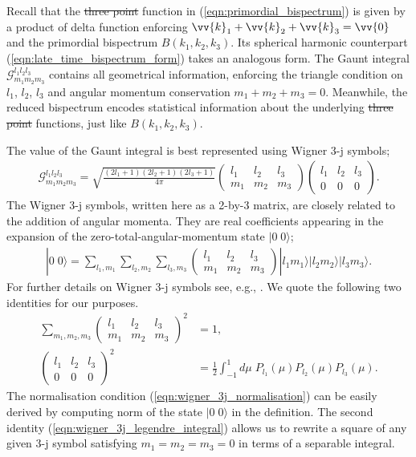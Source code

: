 \documentclass[a4paper,12pt,times,custombib,print,index]{Classes/PhDThesisPSnPDF} %
\providecommand{\DIFadd}[1]{{\protect\color{blue}\uwave{#1}}} %
\providecommand{\DIFdel}[1]{{\protect\color{red}\sout{#1}}}                      %
\providecommand{\DIFaddbegin}{} %
\providecommand{\DIFaddend}{} %
\providecommand{\DIFdelbegin}{} %
\providecommand{\DIFdelend}{} %
\newcommand{\DIFscaledelfig}{0.5}
\newlength{\DIFdelgraphicswidth} %
\newlength{\DIFdelgraphicsheight} %
\newcommand{\DIFaddincludegraphics}[2][]{{\color{blue}\fbox{\DIFOincludegraphics[#1]{#2}}}} %
\newcommand{\DIFdelincludegraphics}[2][]{%
\sbox{\DIFdelgraphicsbox}{\DIFOincludegraphics[#1]{#2}}%
\settoboxwidth{\DIFdelgraphicswidth}{\DIFdelgraphicsbox} %
\settoboxtotalheight{\DIFdelgraphicsheight}{\DIFdelgraphicsbox} %
\scalebox{\DIFscaledelfig}{%
\parbox[b]{\DIFdelgraphicswidth}{\usebox{\DIFdelgraphicsbox}\\[-\baselineskip] \rule{\DIFdelgraphicswidth}{0em}}\llap{\resizebox{\DIFdelgraphicswidth}{\DIFdelgraphicsheight}{%
\setlength{\unitlength}{\DIFdelgraphicswidth}%
\begin{picture}(1,1)%
\thicklines\linethickness{2pt} %
{\color[rgb]{1,0,0}\put(0,0){\framebox(1,1){}}}%
{\color[rgb]{1,0,0}\put(0,0){\line( 1,1){1}}}%
{\color[rgb]{1,0,0}\put(0,1){\line(1,-1){1}}}%
\end{picture}%
}\hspace*{3pt}}} %
} %
\DeclareRobustCommand{\DIFaddbegin}{\DIFOaddbegin \let\includegraphics\DIFaddincludegraphics} %
\DeclareRobustCommand{\DIFaddend}{\DIFOaddend \let\includegraphics\DIFOincludegraphics} %
\DeclareRobustCommand{\DIFdelbegin}{\DIFOdelbegin \let\includegraphics\DIFdelincludegraphics} %
\DeclareRobustCommand{\DIFdelend}{\DIFOaddend \let\includegraphics\DIFOincludegraphics} %
\begin{document}
Recall that the \DIFdelbegin \DIFdel{three point }\DIFdelend \DIFaddbegin \DIFadd{three-point }\DIFaddend function in (\ref{eqn:primordial_bispectrum}) is given by a product of delta function enforcing $\vv{k}_1 + \vv{k}_2 + \vv{k}_3 = \vv{0}$ and the primordial bispectrum $B(k_1,k_2,k_3)$. Its spherical harmonic counterpart (\ref{eqn:late_time_bispectrum_form}) takes an analogous form. The Gaunt integral $\mathcal{G}^{l_1 l_2 l_3}_{m_1 m_2 m_3}$ contains all geometrical information, enforcing the triangle condition on $l_1$, $l_2$, $l_3$ and angular momentum conservation $m_1+m_2+m_3=0$. Meanwhile, the reduced bispectrum encodes statistical information about the underlying \DIFdelbegin \DIFdel{three point }\DIFdelend \DIFaddbegin \DIFadd{three-point }\DIFaddend functions, just like $B(k_1,k_2,k_3)$.

The value of the Gaunt integral is best represented using Wigner 3-j symbols;
\begin{align}
	\mathcal{G}^{l_1 l_2 l_3}_{m_1 m_2 m_3} = \sqrt{\frac{(2l_1+1)(2l_2+1)(2l_3+1)}{4\pi}} \begin{pmatrix}	l_1 & l_2 & l_3 \\ m_1 & m_2 & m_3 \end{pmatrix} \begin{pmatrix}	l_1 & l_2 & l_3 \\ 0 & 0 & 0 \end{pmatrix}.
\end{align}
The Wigner 3-j symbols, written here as a 2-by-3 matrix, are closely related to the addition of angular momenta. They are real coefficients appearing in the expansion of the zero-total-angular-momentum state $|0 \; 0\rangle$;
\begin{align}
	| 0 \; 0 \rangle = \sum_{l_1,m_1} \sum_{l_2,m_2} \sum_{l_3,m_3} \begin{pmatrix}	l_1 & l_2 & l_3 \\ m_1 & m_2 & m_3 \end{pmatrix} | l_1 m_1 \rangle | l_2 m_2 \rangle | l_3 m_3 \rangle.
\end{align}
For further details on Wigner 3-j symbols see, e.g., \cite{Olver2010nist}. We quote the following two identities for our purposes.
\begin{align}
	\sum_{m_1,m_2,m_3} { \begin{pmatrix}	l_1 & l_2 & l_3 \\ m_1 & m_2 & m_3 \end{pmatrix} }^2 &= 1, \label{eqn:wigner_3j_normalisation} \\
	{ \begin{pmatrix}	l_1 & l_2 & l_3 \\ 0 & 0 & 0 \end{pmatrix} }^2 &= \frac{1}{2} \int_{-1}^{1} d\mu \; P_{l_1}(\mu) P_{l_2}(\mu) P_{l_3}(\mu). \label{eqn:wigner_3j_legendre_integral} 
\end{align}
The normalisation condition (\ref{eqn:wigner_3j_normalisation}) can be easily derived by computing \DIFaddbegin \DIFadd{the }\DIFaddend norm of the state $|0 \; 0 \rangle$ in the definition. The second identity (\ref{eqn:wigner_3j_legendre_integral}) allows us to rewrite a square of any given 3-j symbol satisfying $m_1=m_2=m_3=0$ in terms of a separable integral.
\end{document}
